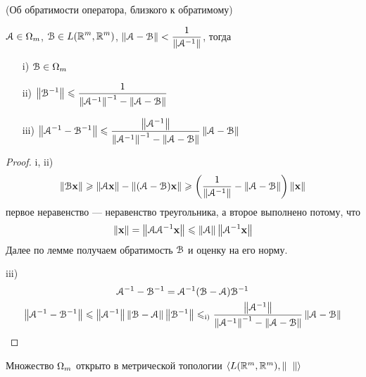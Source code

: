 \begin{theorem}(Об обратимости оператора, близкого к обратимому)

    $\displaystyle \cA \in \O_m$, $\displaystyle \cB \in L(\Rm, \Rm)$,
    $\displaystyle \norm{\cA - \cB} < \frac{1}{\norm{\cA^{-1}}}$, тогда

    \begin{itemize}
        \item[i)] $\cB \in \O_m$
        \item[ii)] $\displaystyle \norm{\cB^{-1}} \leqslant \frac{1}{\norm{\cA^{-
        1}}^{-1} - \norm{\cA - \cB}}$
        \item[iii)] $\displaystyle \norm{\cA^{-1} - \cB^{-1}} \leqslant
        \frac{\norm{\cA^{-1}}}{\norm{\cA^{-1}}^{-1} - \norm{\cA - \cB}}\norm{\cA
        - \cB}$
    \end{itemize}
\end{theorem}
\begin{proof}
    \item[i, ii)]
\[
    \norm{\cB \x} \geqslant \norm{\cA \x} - \norm{(\cA - \cB)\x} \geqslant
    \left( \frac{1}{\norm{\cA^{-1}}} - \norm{\cA - \cB} \right)\norm{\x}
\]
    первое неравенство --- неравенство треугольника, а второе выполнено потому,
    что
\[
    \norm{\x} = \norm{\cA \cA^{-1} \x} \leqslant \norm{\cA} \norm{\cA^{-1} \x}
\]
    Далее по лемме получаем обратимость $\cB$ и оценку на его норму.
    \item[iii)]
    \begin{gather*}
        \cA^{-1} - \cB^{-1} = \cA^{-1}(\cB - \cA)\cB^{-1} \\
        \norm{\cA^{-1} - \cB^{-1}} \leqslant \norm{\cA^{-1}} \norm{\cB - \cA}
        \norm{\cB^{-1}} \leqslant_{\text{i)}} \frac{\norm{\cA^{-1}}}{\norm{\cA^{-
        1}}^{-1} - \norm{\cA - \cB}}\norm{\cA - \cB}
    \end{gather*}
\end{proof}

\begin{corollary}
    Множество $\O_m$ открыто в метрической топологии $\langle L(\Rm, \Rm),
    \norm{\phantom{x }} \rangle$
\end{corollary}
